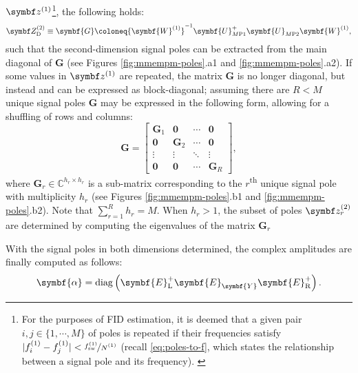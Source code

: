 $\bdzone$\footnote{
    For the purposes of \ac{FID} estimation, it is deemed that a given pair
    $i,j \in \lbrace 1, \cdots, M \rbrace$ of poles is repeated if their
    frequencies satisfy $\lvert \fone_i - \fone_j \rvert <
    \nicefrac{\fswone}{\None}$ (recall \cref{eq:poles-to-f}, which states the
    relationship between a signal pole and its frequency).
    \label{fn:similar-freqs}
}, the following holds:
\begin{equation}
    \bdZtwo_{\text{D}} \equiv \symbf{G} \coloneq
        {\symbf{W}^{(1)}}^{-1}
        \symbf{U}_{M\text{P}1}^+
        \symbf{U}_{M\text{P}2}^{\vphantom{+}}
        \symbf{W}^{(1)},
        \label{eq:G}%
\end{equation}
such that the second-dimension signal poles can be extracted from the main
diagonal of $\symbf{G}$ (see Figures \ref{fig:mmempm-poles}.a1 and
\ref{fig:mmempm-poles}.a2).
If some values in $\bdzone$ are repeated, the matrix $\symbf{G}$ is
no longer diagonal, but instead and can be expressed as block-diagonal;
assuming there are $R < M$ unique signal poles $\symbf{G}$ may be expressed in
the following form, allowing for a shuffling of rows and columns:
\begin{equation}
    \symbf{G} =
    \begin{bmatrix}
        \symbf{G}_1 & \symbf{0} & \cdots & \symbf{0} \\
        \symbf{0} & \symbf{G}_2 & \cdots & \symbf{0} \\
        \vdots & \vdots & \ddots & \vdots \\
        \symbf{0} & \symbf{0} & \cdots & \symbf{G}_R
    \end{bmatrix},
    \label{eq:block-G}%
\end{equation}%
where $\symbf{G}_r \in \mathbb{C}^{h_r \times h_r}$ is a sub-matrix corresponding
to the $r$\textsuperscript{th} unique signal pole with multiplicity $h_r$ (see
Figures \ref{fig:mmempm-poles}.b1 and \ref{fig:mmempm-poles}.b2). Note that
$\sum_{r=1}^R h_r = M$.  When $h_r > 1$, the subset of poles $\bdztwo_r$ are
determined by computing the eigenvalues of the matrix $\symbf{G}_r$

With the signal poles in both dimensions determined, the complex amplitudes are
finally computed as follows:
\begin{equation}
    \symbf{\alpha} = \diag \left( \symbf{E}_{\text{L}}^+ \symbf{E}_{\symbf{Y}}^{\vphantom{+}} \symbf{E}_{\text{R}}^+ \right).
    \label{eq:complex-amplitudes-2d}%
\end{equation}

